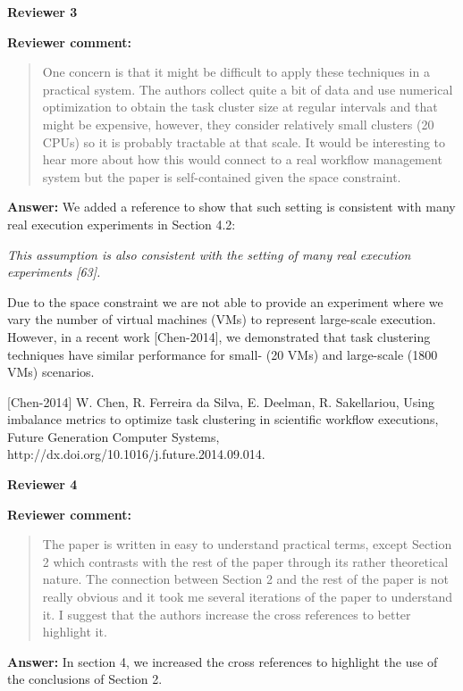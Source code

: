 \documentclass{letter}
\newenvironment{review}%
{\textbf{Reviewer comment:}\begin{quote}}%
{\end{quote}}%
\newcommand{\answer}[1]{%
      \textbf{Answer:} #1}
\newcommand{\revised}[1]{\emph{#1}\color{black}}
\begin{document}
\begin{letter}{}
\newpage

%
%
\textbf{Reviewer 3}

\begin{review}
One concern is that it might be difficult to apply these techniques in a practical system.  The authors collect quite a bit of data and use numerical optimization to obtain the task cluster size at regular intervals and that might be expensive, however, they consider relatively small clusters (20 CPUs) so it is probably tractable at that scale.  It would be interesting to hear more about how this would connect to a real workflow management system but the paper is self-contained given the space constraint. 
\end{review}

\answer{We added a reference to show that such setting is consistent with many real execution experiments in Section 4.2:}

\revised{This assumption is also consistent with the setting of many real execution experiments [63]. }

Due to the space constraint we are not able to provide an experiment where we vary the number of virtual machines (VMs) to represent large-scale execution. However, in a recent work [Chen-2014], we demonstrated that task clustering techniques have similar performance for small- (20 VMs) and large-scale (1800 VMs) scenarios.

[Chen-2014] W. Chen, R. Ferreira da Silva, E. Deelman, R. Sakellariou, Using imbalance metrics to optimize task clustering in scientific workflow executions, Future Generation Computer Systems, http://dx.doi.org/10.1016/j.future.2014.09.014.






\newpage

%
%
\textbf{Reviewer 4}

\begin{review}
The paper is written in easy to understand practical terms, except Section 2 which contrasts with the rest of the paper through its rather theoretical nature. The connection between Section 2 and the rest of the paper is not really obvious and it took me several iterations of the paper to understand it. I suggest that the authors increase the cross references to better highlight it. 
\end{review}

\answer{In section 4, we increased the cross references to highlight the use of the conclusions of Section 2.}




\end{letter}
\end{document}
